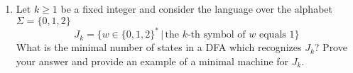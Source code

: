 \documentclass[ x11names, dvipsnames, usenames]{article}
\begin{document}
\vspace{3mm}

\begin{enumerate}  

\item Let $k \ge 1$ be a fixed integer and consider the language over the alphabet $\Sigma = \{0, 1, 2\}$
\[ J_k = \{ w \in \{0, 1, 2\}^* \, | \, \text{the $k$-th symbol of $w$ equals 1} \} \]
What is the minimal number of states in a DFA which recognizes $J_k$? Prove your answer and provide an example of a minimal machine for $J_k$. 
 
\begin{comment} 
 
\vspace{2mm}\hrule\vspace{2mm} 

\textbf{Solution.} \\[0.5mm]  






\vspace{2mm}\hrule\vspace{2mm}




 
  
 \item Using the methods presented in figures 1.46, 1.48, and 1.50 in the textbook, construct an NFA that recognizes the language of the following regular expression
 \[ (a \cup b)^* b a \]
 Present the intermediate automata you obtained  while creating your final answer.
 
\begin{comment}
 
 \vspace{2mm}\hrule\vspace{2mm}  
\textbf{Solution.} \\[0.5mm]






 
  \vspace{2mm}\hrule\vspace{2mm}  
  

\end{comment}
\end{enumerate}
\end{document}
